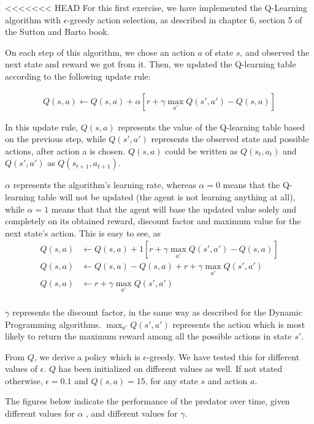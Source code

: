 \documentclass[a4paper,11pt]{article}
\begin{document}
<<<<<<< HEAD
For this first exercise, we have implemented the Q-Learning algorithm with $\epsilon$-greedy action selection, as described in chapter 6, section 5 of the Sutton and Barto book.

On each step of this algorithm, we chose an action $a$ of state $s$, and observed the next state and reward we got from it. Then, we updated the Q-learning table according to the following update rule:  

\begin{align*}
  Q(s,a) \leftarrow  Q(s,a) + \alpha \left[ r + \gamma  \max_{a'} Q(s',a') - Q(s,a)\right]
\end{align*}

In this update rule, $Q(s,a)$ represents the value of the Q-learning table based on the previous step, while $Q(s',a')$ represents the observed state and possible actions, after action a is chosen. $Q(s,a)$ could be written as $Q(s_t,a_t)$ and $Q(s',a')$ as $Q(s_{t+1}, a_{t+1})$.

$\alpha$ represents the algorithm's learning rate, whereas $\alpha =0$ means that the Q-learning table will not be updated (the agent is not learning anything at all), while $\alpha =1$ means that that the agent will base the updated value solely and completely on its obtained reward, discount factor and maximum value for the next state's action.  This is easy to see, as
\begin{align*}
  Q(s,a) &\leftarrow  Q(s,a) + 1 \left[ r + \gamma  \max_{a'} Q(s',a') - Q(s,a)\right]\\
  Q(s,a) &\leftarrow  Q(s,a) - Q(s,a) + r + \gamma  \max_{a'} Q(s',a') \\
  Q(s,a) &\leftarrow  r + \gamma  \max_{a'} Q(s',a') \\
\end{align*}

$\gamma$ represents the discount factor, in the same way as described for the Dynamic Programming algorithms.  $\max_{a'} Q(s', a')$ represents the action which is most likely to return the maximum reward among all the possible actions in state $s'$.

From $Q$, we derive a policy which is $\epsilon$-greedy.  We have tested this for different values of $\epsilon$.  $Q$ has been initialized on different values as well.  If not stated otherwise, $\epsilon = 0.1$ and $Q(s, a) = 15$, for any state $s$ and action $a$.

The figures below indicate the performance of the predator over time, given different values for $\alpha$ , and different values for $\gamma$.
\end{document}
